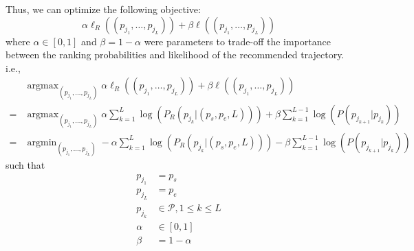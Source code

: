 \documentclass{sig-alternate-05-2015}
\DeclareMathOperator*{\argmin}{argmin}
\DeclareMathOperator*{\argmax}{argmax}
\begin{document}


Thus, we can optimize the following objective:
\begin{displaymath}
    \alpha \ell_R((p_{j_1}, \dots, p_{j_L})) + \beta \ell((p_{j_1}, \dots, p_{j_L}))
\end{displaymath}
where $\alpha \in [0, 1]$ and $\beta = 1 - \alpha$ were parameters to trade-off the importance between the ranking probabilities 
and likelihood of the recommended trajectory.
i.e.,
\begin{align*}
    & \argmax_{(p_{j_1}, \dots, p_{j_L})} \alpha \ell_R((p_{j_1}, \dots, p_{j_L})) + \beta \ell((p_{j_1}, \dots, p_{j_L})) \\
   =& \argmax_{(p_{j_1}, \dots, p_{j_L})} \alpha \sum_{k=1}^L \log \left( P_R(p_{j_k} |(p_s, p_e, L)) \right) + 
      \beta \sum_{k=1}^{L-1} \log \left( P(p_{j_{k+1}} | p_{j_k}) \right) \\
   =& \argmin_{(p_{j_1}, \dots, p_{j_L})} - \alpha \sum_{k=1}^L \log \left( P_R(p_{j_k} |(p_s, p_e, L)) \right) -
      \beta \sum_{k=1}^{L-1} \log \left( P(p_{j_{k+1}} | p_{j_k}) \right) 
\end{align*}
such that
\begin{align*}
    p_{j_1} &= p_s \\
    p_{j_L} &= p_e \\
    p_{j_k} &\in \mathcal{P}, 1 \le k \le L \\
    \alpha  &\in [0, 1] \\
    \beta   &= 1 - \alpha
\end{align*}
\end{document}
